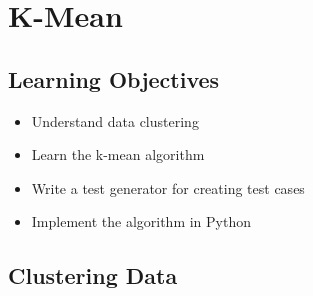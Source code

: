\chapter{K-Mean}
\label{chapter:kmean}

\section{Learning Objectives}

\begin{itemize}

\item Understand data clustering  
  
\item Learn the k-mean algorithm

\item Write a test generator for creating test cases

\item Implement the algorithm in Python

  
\end{itemize}

\section{Clustering Data}

